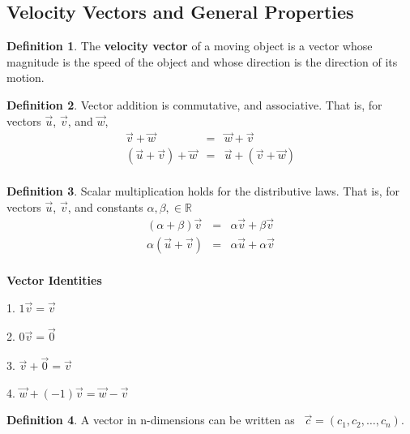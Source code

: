 \documentclass[12pt, a4paper]{article}
\theoremstyle{plain}
\theoremstyle{definition}
\newtheorem{definition}{Definition}[section]
\theoremstyle{remark}
\newcommand{\RR}{\mathbb{R}}
\begin{document}
\newpage
\subsection{Velocity Vectors and General Properties}

\begin{definition}
The \textbf{velocity vector} of a moving object is a vector whose magnitude is the speed of the object and whose direction is the direction of its motion.  
\end{definition}

\begin{definition}
Vector addition is commutative, and associative. That is, for vectors $\vec{u}$, $\vec{v}$, and $\vec{w}$, 
\begin{eqnarray*}
\vec{v}+ \vec{w} &=& \vec{w}+\vec{v} \\
(\vec{u} + \vec{v}) + \vec{w} &=& \vec{u}+ (\vec{v} + \vec{w}) \\
\end{eqnarray*}
\end{definition}

\begin{definition}
Scalar multiplication holds for the distributive laws. That is, for vectors $\vec{u}$, $\vec{v}$, and constants $\alpha , \beta, \in \RR$
\begin{eqnarray*}
(\alpha+\beta) \vec{v} &=& \alpha \vec{v}+ \beta \vec{v} \\
\alpha (\vec{u} + \vec{v}) &=& \alpha \vec{u}+ \alpha \vec{v} \\
\end{eqnarray*}
\end{definition}

\textbf{Vector Identities}
\vspace{.05in}

1. $1\vec{v} = \vec{v} $

2. $0\vec{v} = \vec{0}$
 
3. $\vec{v} + \vec{0} = \vec{v}$
 
4. $\vec{w} + (-1)\vec{v} = \vec{w} - \vec{v} $



\begin{definition}
A vector in n-dimensions can be written as \,
$ \vec{c} = (c_1, c_2, \ldots , c_n)$.
\end{definition}
\end{document}
